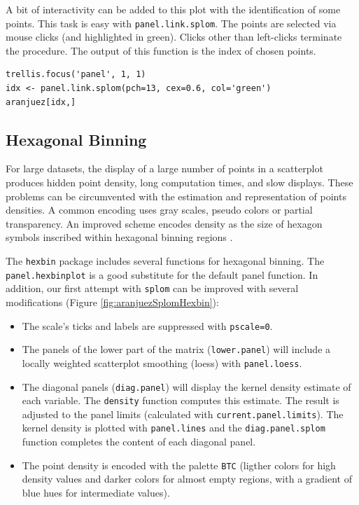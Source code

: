 \documentclass[smallroyalvopaper]{memoir}
\begin{document}
A bit of interactivity can be added to this plot with the
identification of some points. This task is easy with
\texttt{panel.link.splom}. The points are selected via mouse clicks (and
highlighted in green). Clicks other than left-clicks terminate the
procedure. The output of this function is the index of chosen
points.


\lstset{language=R,label= ,caption= ,captionpos=b,numbers=none}
\begin{lstlisting}
trellis.focus('panel', 1, 1)
idx <- panel.link.splom(pch=13, cex=0.6, col='green')
aranjuez[idx,]
\end{lstlisting}


\subsection{Hexagonal Binning}
\label{sec:orgheadline1}
\label{orgtarget2}

For large datasets, the display of a large number of points in a
scatterplot produces hidden point density, long computation times,
and slow displays. These problems can be circumvented with the
estimation and representation of points densities.  A common
encoding uses gray scales, pseudo colors or partial
transparency. An improved scheme encodes density as the size of
hexagon symbols inscribed within hexagonal binning regions
\cite{Carr.Littlefield.ea1987}.

The \texttt{hexbin} package \cite{Carr.Lewin-Koh.ea2013} includes several
functions for hexagonal binning.  The \texttt{panel.hexbinplot} is a good
substitute for the default panel function. In addition, our first
attempt with \texttt{splom} can be improved with several modifications
(Figure \ref{fig:aranjuezSplomHexbin}):
\begin{itemize}
\item The scale's ticks and labels are suppressed with \texttt{pscale=0}.
\item The panels of the lower part of the matrix (\texttt{lower.panel}) will
include a locally weighted scatterplot smoothing (loess) with
\texttt{panel.loess}.
\item The diagonal panels (\texttt{diag.panel}) will display the kernel
density estimate of each variable. The \texttt{density} function
computes this estimate. The result is adjusted to the panel
limits (calculated with \texttt{current.panel.limits}). The kernel
density is plotted with \texttt{panel.lines} and the \texttt{diag.panel.splom}
function completes the content of each diagonal panel.
\item The point density is encoded with the palette \texttt{BTC} (ligther
colors for high density values and darker colors for almost
empty regions, with a gradient of blue hues for intermediate values).
\end{itemize}
\end{document}
